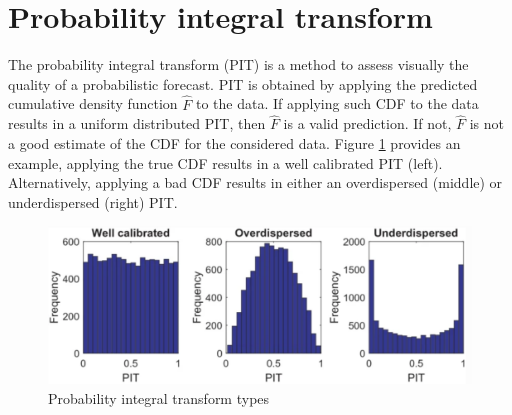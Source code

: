 \section{Probability integral transform}
The probability integral transform (PIT) is a method to assess visually the quality of a probabilistic forecast. PIT is obtained by applying the predicted cumulative density function $\hat{F}$ to the data. If applying such CDF to the data results in a uniform distributed PIT, then $\hat{F}$ is a valid prediction. If not, $\hat{F}$ is not a good estimate of the CDF for the considered data. Figure \ref{fig:pit} provides an example, applying the true CDF results in a well calibrated PIT (left). Alternatively, applying a bad CDF results in either an overdispersed (middle) or underdispersed (right) PIT.
\begin{figure}
    \includegraphics[width=\textwidth]{images/pit.png}
    \caption{Probability integral transform types \cite{haben2023core}}
    \label{fig:pit}
  \end{figure}
\\

